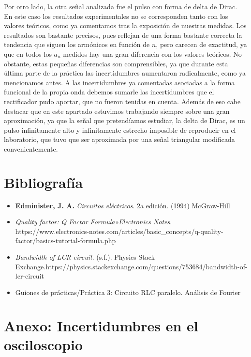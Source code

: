 \documentclass[a4paper,12pt,titlepage]{article}
\begin{document}
Por otro lado, la otra señal analizada fue el pulso con forma de delta de Dirac. En este caso los resultados experimentales no se corresponden tanto con los valores teóricos, como ya comentamos tras la exposición de nuestras medidas. Los resultados son bastante precisos, pues reflejan de una forma bastante correcta la tendencia que siguen los armónicos en función de $n$, pero carecen de exactitud, ya que en todos los $a_n$ medidos hay una gran diferencia con los valores teóricos. No obstante, estas pequeñas diferencias son comprensibles, ya que durante esta última parte de la práctica las incertidumbres aumentaron radicalmente, como ya mencionamos antes. A las incertidumbres ya comentadas asociadas a la forma funcional de la propia onda debemos sumarle las incertidumbres que el rectificador pudo aportar, que no fueron tenidas en cuenta. Además de eso cabe destacar que en este apartado estuvimos trabajando siempre sobre una gran aproximación, ya que la señal que pretendíamos estudiar, la delta de Dirac, es un pulso infinitamente alto y infinitamente estrecho imposible de reproducir en el laboratorio, que tuvo que ser aproximada por una señal triangular modificada convenientemente.

\newpage

\section{Bibliografía}

\begin{itemize}
    \item \textbf{Edminister, J. A.} \textit{Circuitos eléctricos}. 2a edición. (1994) McGraw-Hill
    \item \textit{Quality factor: Q Factor Formula»Electronics Notes}. https://www.electronics-notes.com\newline/articles/basic\_concepts/q-quality-factor/basics-tutorial-formula.php
    \item \textit{Bandwidth of LCR circuit}. (s.f.). Physics Stack Exchange.https://physics.stackexchange.com\newline/questions/753684/bandwidth-of-lcr-circuit
    \item Guiones de prácticas/Práctica 3: Circuito RLC paralelo. Análisis de Fourier
\end{itemize}

\newpage

\section{Anexo: Incertidumbres en el osciloscopio}
\end{document}

